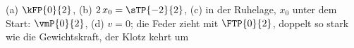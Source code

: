(a) $\kFP{0}{2}$, (b) $2\,x_0 = \sTP{-2}{2}$, (c) in der Ruhelage, $x_0$ unter dem Start: $\vmP{0}{2}$, (d) $v = 0$; die Feder zieht mit $\FTP{0}{2}$, doppelt so stark wie die Gewichtskraft, der Klotz kehrt um
